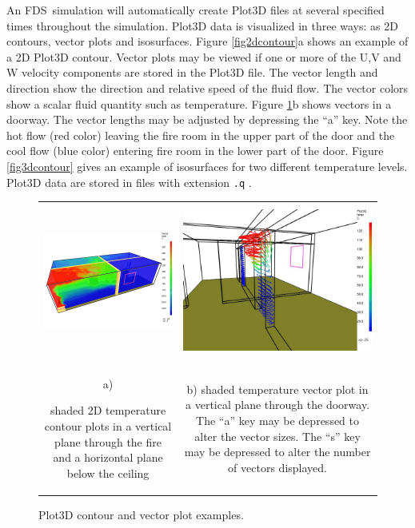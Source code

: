 \documentclass[11pt,twoside]{book}
\newcommand{\figoptions}{hbp}
\newcommand{\fds}{{FDS}}
\begin{document}
An \fds\ simulation will automatically  create Plot3D files at several
specified times throughout the simulation. Plot3D data is
visualized in three ways: as 2D contours, vector plots and
isosurfaces. Figure \ref{fig2dcontour}a shows an example of a 2D
Plot3D contour. Vector plots may be viewed if one or more of the
U,V and W velocity components are stored in the Plot3D file. The
vector length and direction show the direction and relative speed
of the fluid flow. The vector colors show a scalar fluid quantity
such as temperature. Figure \ref{figvector2}b shows vectors in a
doorway. The vector lengths may be adjusted by depressing the
``a'' key.  Note the hot flow (red color) leaving the fire room in
the upper part of the door and the cool flow (blue color) entering
fire room in the lower part of the door. Figure \ref{fig3dcontour}
gives an example of isosurfaces for two different temperature
levels. Plot3D data are stored in files with extension {\tt .q} .

\begin{figure}[\figoptions]
\begin{center}
\begin{tabular}{cc}
\includegraphics[height=2.0in]{figures/roomfire_plot3d}
&\includegraphics[height=2.0in]{figures/roomfire_plot3dv}\\
a)

\parbox[t]{2.5in}{shaded 2D temperature contour plots in a vertical plane through the fire and a
horizontal plane below the ceiling}
&
b)
\parbox[t]{2.5in}{shaded temperature vector plot in a vertical plane through the doorway.
The ``a'' key may be depressed to alter the vector sizes.
The ``s'' key may be depressed to alter the number of vectors displayed.
}
\end{tabular}
\end{center}
\caption{Plot3D contour and vector plot examples.  }
\label{fig2dcontour}%
\label{figvector2}
\end{figure}
\end{document}
